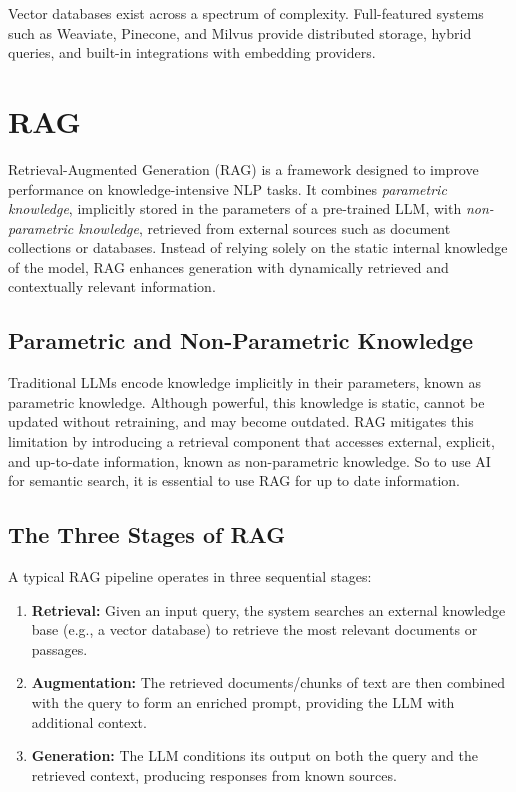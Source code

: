 Vector databases exist across a spectrum of complexity. Full-featured systems such as Weaviate, Pinecone, and Milvus provide distributed storage, hybrid queries, and built-in integrations with embedding providers.

\section{\acl{RAG}}
\label{sec:rag}

Retrieval-Augmented Generation (\ac{RAG}) is a framework designed to improve performance on knowledge-intensive \ac{NLP} tasks. It combines \textit{parametric knowledge}, implicitly stored in the parameters of a pre-trained \ac{LLM}, with \textit{non-parametric knowledge}, retrieved from external sources such as document collections or databases. Instead of relying solely on the static internal knowledge of the model, RAG enhances generation with dynamically retrieved and contextually relevant information.

\subsection{Parametric and Non-Parametric Knowledge}
Traditional \acp{LLM} encode knowledge implicitly in their parameters, known as parametric knowledge. Although powerful, this knowledge is static, cannot be updated without retraining, and may become outdated.  
\ac{RAG} mitigates this limitation by introducing a retrieval component that accesses external, explicit, and up-to-date information, known as non-parametric knowledge. So to use AI for semantic search, it is essential to use \ac{RAG} for up to date information.

\subsection{The Three Stages of RAG}
A typical RAG pipeline operates in three sequential stages:
\begin{enumerate}
    \item \textbf{Retrieval:} Given an input query, the system searches an external knowledge base (e.g., a vector database) to retrieve the most relevant documents or passages.  
    \item \textbf{Augmentation:} The retrieved documents/chunks of text are then combined with the query to form an enriched prompt, providing the \ac{LLM} with additional context.  
    \item \textbf{Generation:} The \ac{LLM} conditions its output on both the query and the retrieved context, producing responses from known sources. 
\end{enumerate}

